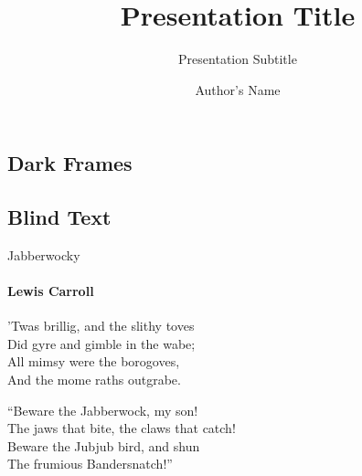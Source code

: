 \documentclass{beamer}
\title{Presentation Title} %
\subtitle{Presentation Subtitle} %
\author{Author's Name}
\begin{document}
  \frame{\maketitle}


  \begin{darkframes}
    \section{Dark Frames}
    \subsection{Blind Text}
    \begin{frame}{Jabberwocky}
      \framesubtitle{Lewis Carroll}%
      'Twas brillig, and the slithy toves\\
      Did gyre and gimble in the wabe;\\
      All mimsy were the borogoves,\\
      And the mome raths outgrabe.\\\bigskip

      “Beware the Jabberwock, my son!\\
      The jaws that bite, the claws that catch!\\
      Beware the Jubjub bird, and shun\\
      The frumious Bandersnatch!”\\
    \end{frame}


\end{darkframes}
\end{document}
